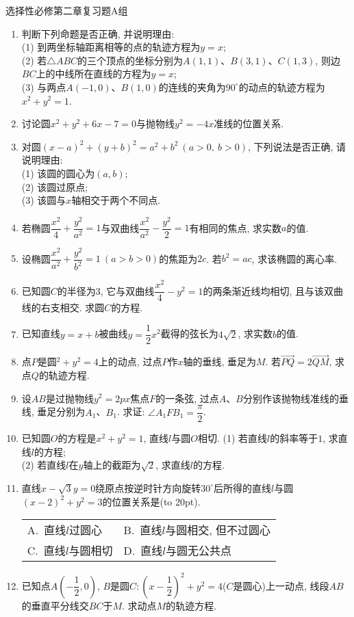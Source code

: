 \documentclass[10pt,a4paper]{article}
\newcommand{\bracket}[1]{(\hbox to #1pt{})}
\newcommand{\twoch}[4]{\par\begin{tabular}{p{.46\textwidth}p{.46\textwidth}}
A.~#1& B.~#2\\
C.~#3& D.~#4
\end{tabular}}
\begin{document}
选择性必修第二章复习题A组

\begin{enumerate}[1.]

\item 判断下列命题是否正确, 并说明理由:\\
(1) 到两坐标轴距离相等的点的轨迹方程为$y=x$;\\
(2) 若$\triangle ABC$的三个顶点的坐标分别为$A(1, 1)$、$B(3, 1)$、$C(1, 3)$, 则边$BC$上的中线所在直线的方程为$y=x$;\\
(3) 与两点$A(-1, 0)$、$B(1, 0)$的连线的夹角为$90^\circ$的动点的轨迹方程为$x^2+y^2=1$.
\vspace*{3cm}
\item 讨论圆$x^2+y^2+6x-7=0$与抛物线$y^2=-4x$准线的位置关系.
\vspace*{3cm}
\item 对圆$(x-a)^2+(y+b)^2=a^2+b^2\ (a>0, \ b>0)$, 下列说法是否正确, 请说明理由:\\
(1) 该圆的圆心为$(a, b)$;\\
(2) 该圆过原点;\\
(3) 该圆与$x$轴相交于两个不同点.
\vspace*{3cm}
\item 若椭圆$\dfrac{x^2}{4}+\dfrac{y^2}{a^2}=1$与双曲线$\dfrac{x^2}{a^2}-\dfrac{y^2}2=1$有相同的焦点, 求实数$a$的值.
\vspace*{3cm}
\item 设椭圆$\dfrac{x^2}{a^2}+\dfrac{y^2}{b^2}=1 \ (a>b>0)$的焦距为$2c$. 若$b^2=ac$, 求该椭圆的离心率.
\vspace*{3cm}
\item 已知圆$C$的半径为$3$, 它与双曲线$\dfrac{x^2}4-y^2=1$的两条渐近线均相切, 且与该双曲线的右支相交. 求圆$C$的方程.
\vspace*{3cm}
\item 已知直线$y=x+b$被曲线$y=\dfrac 12x^2$截得的弦长为$4\sqrt 2$, 求实数$b$的值.
\vspace*{3cm}
\item 点$P$是圆$^2+y^2=4$上的动点, 过点$P$作$x$轴的垂线, 垂足为$M$. 若$\overrightarrow{PQ}=2\overrightarrow{QM}$, 求点$Q$的轨迹方程.
\vspace*{3cm}
\item 设$AB$是过抛物线$y^2=2px$焦点$F$的一条弦, 过点$A$、$B$分别作该抛物线准线的垂线, 垂足分别为$A_1$、$B_1$. 求证: $\angle A_1FB_1=\dfrac\pi 2$.
\vspace*{3cm}
\item 已知圆$O$的方程是$x^2+y^2=1$, 直线$l$与圆$O$相切.
(1) 若直线$l$的斜率等于$1$, 求直线$l$的方程;\\
(2) 若直线$l$在$y$轴上的截距为$\sqrt 2$, 求直线$l$的方程.
\vspace*{3cm}
\item 直线$x-\sqrt 3y=0$绕原点按逆时针方向旋转$30^\circ$后所得的直线$l$与圆$(x-2)^2+y^2=3$的位置关系是\bracket{20}.
\twoch{直线$l$过圆心}{直线$l$与圆相交, 但不过圆心}{直线$l$与圆相切}{直线$l$与圆无公共点}
\vspace*{3cm}
\item 已知点$A(-\dfrac 12, 0)$, $B$是圆$C: (x-\dfrac 12)^2+y^2=4$($C$是圆心)上一动点, 线段$AB$的垂直平分线交$BC$于$M$. 求动点$M$的轨迹方程.
\vspace*{3cm}
\end{enumerate}
\end{document}
